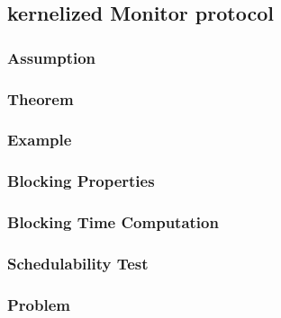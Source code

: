 \subsection{kernelized Monitor protocol}
\subsubsection{Assumption}
\subsubsection{Theorem}
\subsubsection{Example}
\subsubsection{Blocking Properties}
\subsubsection{Blocking Time Computation}
\subsubsection{Schedulability Test}
\subsubsection{Problem}